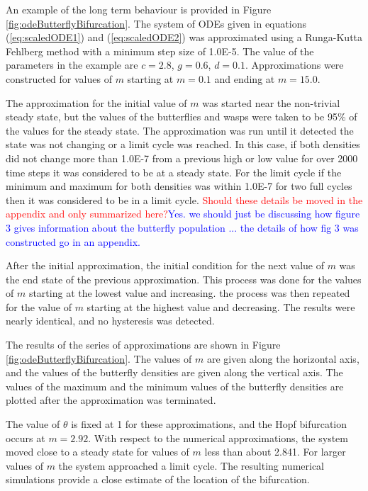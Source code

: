 \documentclass[review,authoryear]{elsarticle}
\begin{document}
An example of the long term behaviour is provided in Figure
\ref{fig:odeButterflyBifurcation}. The system of ODEs given in
equations (\ref{eq:scaledODE1}) and (\ref{eq:scaledODE2}) was
approximated using a Runga-Kutta Fehlberg method with a minimum step
size of 1.0E-5.  The value of the parameters in the example are
$c=2.8$, $g=0.6$, $d=0.1$. Approximations were constructed for values
of $m$ starting at $m=0.1$ and ending at $m=15.0$.

The approximation for the initial value of $m$ was started near the
non-trivial steady state, but the values of the butterflies and wasps
were taken to be 95\% of the values for the steady state. The
approximation was run until it detected the state was not changing or
a limit cycle was reached. In this case, if both densities did not
change more than 1.0E-7 from a previous high or low value for over
2000 time steps it was considered to be at a steady state. For the
limit cycle if the minimum and maximum for both densities was within
1.0E-7 for two full cycles then it was considered to be in a limit
cycle. \textcolor{red}{Should these details be moved in the appendix and only summarized here?}\textcolor{blue}{Yes.  we should just be discussing how figure 3 gives information about the butterfly population ... the details of how fig 3 was constructed go in an appendix.}

After the initial approximation, the initial condition for the next
value of $m$ was the end state of the previous approximation. This
process was done for the values of $m$ starting at the lowest value
and increasing. the process was then repeated for the value of $m$
starting at the highest value and decreasing. The results were nearly
identical, and no hysteresis was detected.

The results of the series of approximations are shown in Figure
\ref{fig:odeButterflyBifurcation}. The values of $m$ are given along
the horizontal axis, and the values of the butterfly densities are
given along the vertical axis. The values of the maximum and the
minimum values of the butterfly densities are plotted after the
approximation was terminated.

The value of $\theta$ is fixed at 1 for these approximations, and the Hopf bifurcation occurs at $m=2.92$. With respect to the numerical approximations, the system moved close to a steady state for values of $m$ less than about 2.841. For larger values of $m$ the system approached a limit
cycle. The resulting numerical simulations provide a close estimate of the location of the bifurcation.
\end{document}
